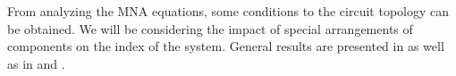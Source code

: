 %
%
%
%
%
%	
%
%


From analyzing the MNA equations, some conditions to the circuit topology can be obtained. We will be considering the impact of special arrangements of components on the index of the system. General results are presented in \cite{Tischendorf2005Topological} as well as in \cite{shashkov_tuprints27452} and \cite{Reis2014}.



